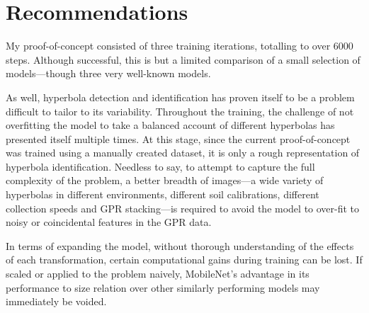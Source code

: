 \documentclass[se,blockletter]{uw-wkrpt}
\begin{document}
\section{Recommendations}
My proof-of-concept consisted of three training iterations, totalling to over 6000 steps. Although successful, this is but a limited comparison of a small selection of models---though three very well-known models. 

As well, hyperbola detection and identification has proven itself to be a problem difficult to tailor to its variability. Throughout the training, the challenge of not overfitting the model to take a balanced account of different hyperbolas has presented itself multiple times. At this stage, since the current proof-of-concept was trained using a manually created dataset, it is only a rough representation of hyperbola identification. Needless to say, to attempt to capture the full complexity of the problem, a better breadth of images---a wide variety of hyperbolas in different environments, different soil calibrations, different collection speeds and GPR stacking---is required to avoid the model to over-fit to noisy or coincidental features in the GPR data.

In terms of expanding the model, without thorough understanding of the effects of each transformation, certain computational gains during training can be lost. If scaled or applied to the problem naively, MobileNet's advantage in its performance to size relation over other similarly performing models may immediately be voided.

\backmatter

%




\appendix
\end{document}

